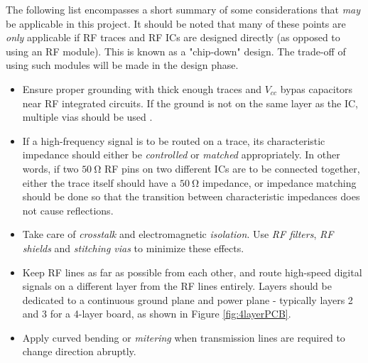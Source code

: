 The following list encompasses a short summary of some considerations that \textit{may} be applicable in this project. It should be noted that many of these points are \textit{only} applicable if RF traces and RF ICs are designed directly (as opposed to using an RF module). This is known as a "chip-down" design. The trade-off of using such modules will be made in the design phase.
\begin{itemize}
    \item Ensure proper grounding with thick enough traces and $V_{cc}$ bypas capacitors near RF integrated circuits. If the ground is not on the same layer as the IC, multiple vias should be used \cite{datasheet-MAX2659}. 
    \item If a high-frequency signal is to be routed on a trace, its characteristic impedance should either be \textit{controlled} or \textit{matched} appropriately. In other words, if two $\SI{50}{\ohm}$ RF pins on two different ICs are to be connected together, either the trace itself should have a $\SI{50}{\ohm}$ impedance, or impedance matching should be done so that the transition between characteristic impedances does not cause reflections. \cite{datasheet-MAX2659}
    \item Take care of \textit{crosstalk} and electromagnetic \textit{isolation}. Use \textit{RF filters}, \textit{RF shields} and \textit{stitching vias} to minimize these effects.
    \item Keep RF lines as far as possible from each other, and route high-speed digital signals on a different layer from the RF lines entirely. Layers should be dedicated to a continuous ground plane and power plane - typically layers 2 and 3 for a 4-layer board, as shown in Figure \ref{fig:4layerPCB}. \cite{site-rfPCBGuidelines}
    \item Apply curved bending or \textit{mitering} when transmission lines are required to change direction abruptly. \cite{site-rfPCBGuidelines}
\end{itemize}